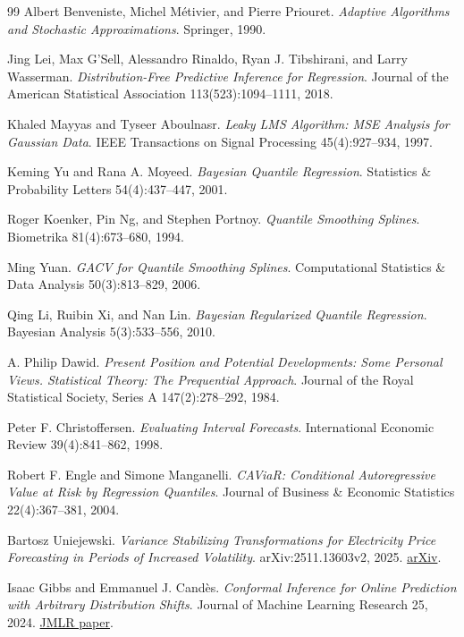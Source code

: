 \documentclass[11pt,a4paper]{article}
\theoremstyle{definition}
\theoremstyle{remark}
\begin{document}
\begin{thebibliography}{99}
Albert Benveniste, Michel M\'etivier, and Pierre Priouret.
\emph{Adaptive Algorithms and Stochastic Approximations}. Springer, 1990.

Jing Lei, Max G'Sell, Alessandro Rinaldo, Ryan J. Tibshirani, and Larry
Wasserman.
\emph{Distribution-Free Predictive Inference for Regression}.
Journal of the American Statistical Association 113(523):1094--1111, 2018.

Khaled Mayyas and Tyseer Aboulnasr.
\emph{Leaky LMS Algorithm: MSE Analysis for Gaussian Data}.
IEEE Transactions on Signal Processing 45(4):927--934, 1997.

Keming Yu and Rana A. Moyeed.
\emph{Bayesian Quantile Regression}.
Statistics \& Probability Letters 54(4):437--447, 2001.

Roger Koenker, Pin Ng, and Stephen Portnoy.
\emph{Quantile Smoothing Splines}.
Biometrika 81(4):673--680, 1994.

Ming Yuan.
\emph{GACV for Quantile Smoothing Splines}.
Computational Statistics \& Data Analysis 50(3):813--829, 2006.

Qing Li, Ruibin Xi, and Nan Lin.
\emph{Bayesian Regularized Quantile Regression}.
Bayesian Analysis 5(3):533--556, 2010.

A. Philip Dawid.
\emph{Present Position and Potential Developments: Some Personal Views.
Statistical Theory: The Prequential Approach}.
Journal of the Royal Statistical Society, Series A 147(2):278--292, 1984.

Peter F. Christoffersen.
\emph{Evaluating Interval Forecasts}.
International Economic Review 39(4):841--862, 1998.

Robert F. Engle and Simone Manganelli.
\emph{CAViaR: Conditional Autoregressive Value at Risk by Regression Quantiles}.
Journal of Business \& Economic Statistics 22(4):367--381, 2004.

Bartosz Uniejewski.
\emph{Variance Stabilizing Transformations for Electricity Price
Forecasting in Periods of Increased Volatility}.
arXiv:2511.13603v2, 2025.
\href{https://arxiv.org/abs/2511.13603}{arXiv}.

Isaac Gibbs and Emmanuel J. Cand\`es.
\emph{Conformal Inference for Online Prediction with Arbitrary Distribution Shifts}.
Journal of Machine Learning Research 25, 2024.
\href{https://jmlr.org/papers/v25/22-1218.html}{JMLR paper}.


\end{thebibliography}
\end{document}
